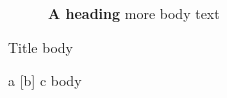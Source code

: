 \begin{figure}
\begin{center}
{\bfseries A heading}
more body text
\end{center}
\end{figure}

\begin{frame}{Title}
body
\end{frame}

\begin{myenv}{a}    [b]   {c}
body
\end{myenv}

